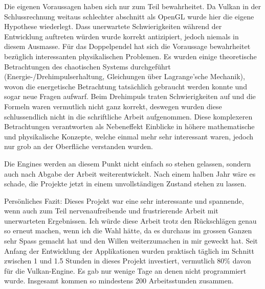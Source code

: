 \documentclass[titlepage, 11pt, a4paper, ngerman]{article}
\begin{document}
Die eigenen Voraussagen haben sich nur zum Teil bewahrheitet. Da Vulkan in der Schlussrechnung weitaus schlechter abschnitt als OpenGL wurde hier die eigene Hypothese wiederlegt. Dass unerwartete Schwierigkeiten während der Entwicklung auftreten würden wurde korrekt antizipiert, jedoch niemals in diesem Ausmasse. Für das Doppelpendel hat sich die Voraussage bewahrheitet bezüglich interessanten physikalischen Problemen. Es wurden einige theoretische Betrachtungen des chaotischen Systems durchgeführt (Energie-/Drehimpulserhaltung, Gleichungen über Lagrange'sche Mechanik), wovon die energetische Betrachtung tatsächlich gebraucht werden konnte und sogar neue Fragen aufwarf. Beim Drehimpuls traten Schwierigkeiten auf und die Formeln waren vermutlich nicht ganz korrekt, deswegen wurden diese schlussendlich nicht in die schriftliche Arbeit aufgenommen. Diese komplexeren Betrachtungen verantworten als Nebeneffekt Einblicke in höhere mathematische und physikalische Konzepte, welche einmal mehr sehr interessant waren, jedoch nur grob an der Oberfläche verstanden wurden.\par
Die \glspl{Engine} werden an diesem Punkt nicht einfach so stehen gelassen, sondern auch nach Abgabe der Arbeit weiterentwickelt. Nach einem halben Jahr wäre es schade, die Projekte jetzt in einem unvollständigen Zustand stehen zu lassen.\par
Persönliches Fazit: Dieses Projekt war eine sehr interessante und spannende, wenn auch zum Teil nervenaufreibende und frustrierende Arbeit mit unerwarteten Ergebnissen. Ich würde diese Arbeit trotz den Rückschlägen genau so erneut machen, wenn ich die Wahl hätte, da es durchaus im grossen Ganzen sehr Spass gemacht hat und den Willen weiterzumachen in mir geweckt hat. Seit Anfang der Entwicklung der Applikationen wurden praktisch täglich im Schnitt zwischen 1 und 1.5 Stunden in dieses Projekt investiert, vermutlich 80\% davon für die Vulkan-Engine. Es gab nur wenige Tage an denen nicht programmiert wurde. Insgesamt kommen so mindestens 200 Arbeitsstunden zusammen.

\newpage
\end{document}
